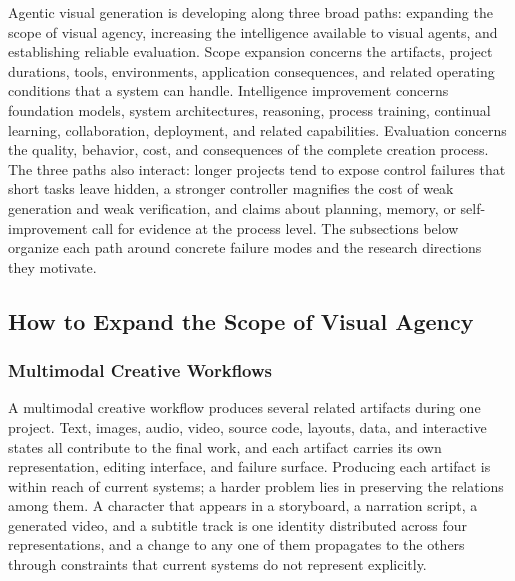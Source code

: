 Agentic visual generation is developing along three broad paths: expanding the scope of visual agency, increasing the intelligence available to visual agents, and establishing reliable evaluation. Scope expansion concerns the artifacts, project durations, tools, environments, application consequences, and related operating conditions that a system can handle. Intelligence improvement concerns foundation models, system architectures, reasoning, process training, continual learning, collaboration, deployment, and related capabilities. Evaluation concerns the quality, behavior, cost, and consequences of the complete creation process. The three paths also interact: longer projects tend to expose control failures that short tasks leave hidden, a stronger controller magnifies the cost of weak generation and weak verification, and claims about planning, memory, or self-improvement call for evidence at the process level. The subsections below organize each path around concrete failure modes and the research directions they motivate.

\subsection{How to Expand the Scope of Visual Agency}


\subsubsection{Multimodal Creative Workflows}

A multimodal creative workflow produces several related artifacts during one project. Text, images, audio, video, source code, layouts, data, and interactive states all contribute to the final work, and each artifact carries its own representation, editing interface, and failure surface. Producing each artifact is within reach of current systems; a harder problem lies in preserving the relations among them. A character that appears in a storyboard, a narration script, a generated video, and a subtitle track is one identity distributed across four representations, and a change to any one of them propagates to the others through constraints that current systems do not represent explicitly.


